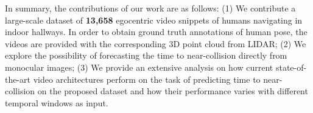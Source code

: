 In summary, the contributions of our work are as follows: (1) We contribute a large-scale dataset of \textbf{13,658} egocentric video snippets of humans navigating in indoor hallways. In order to obtain ground truth annotations of human pose, the videos are provided with the corresponding 3D point cloud from LIDAR; (2) We explore the possibility of forecasting the time to near-collision directly from monocular images; (3) We provide an extensive analysis on how current state-of-the-art video architectures perform on the task of predicting time to near-collision on the proposed dataset and how their performance varies with different temporal windows as input.